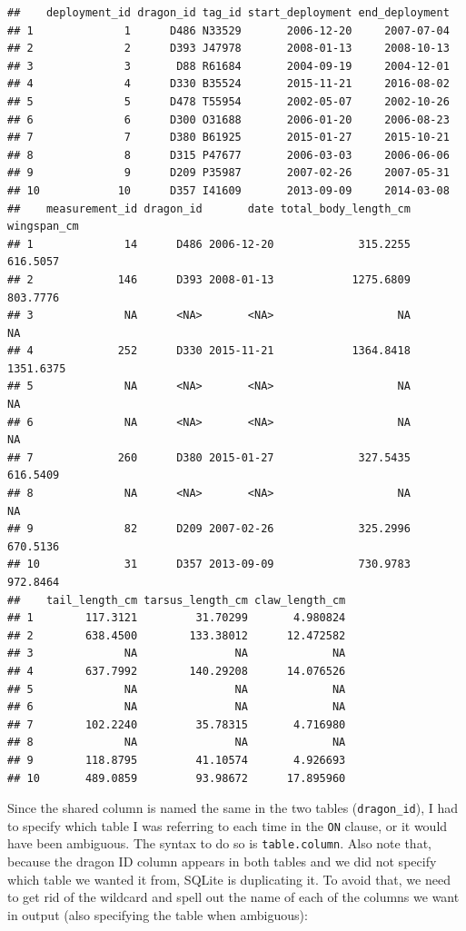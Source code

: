 \documentclass[
]{book}
\begin{document}
\begin{verbatim}
##    deployment_id dragon_id tag_id start_deployment end_deployment
## 1              1      D486 N33529       2006-12-20     2007-07-04
## 2              2      D393 J47978       2008-01-13     2008-10-13
## 3              3       D88 R61684       2004-09-19     2004-12-01
## 4              4      D330 B35524       2015-11-21     2016-08-02
## 5              5      D478 T55954       2002-05-07     2002-10-26
## 6              6      D300 O31688       2006-01-20     2006-08-23
## 7              7      D380 B61925       2015-01-27     2015-10-21
## 8              8      D315 P47677       2006-03-03     2006-06-06
## 9              9      D209 P35987       2007-02-26     2007-05-31
## 10            10      D357 I41609       2013-09-09     2014-03-08
##    measurement_id dragon_id       date total_body_length_cm wingspan_cm
## 1              14      D486 2006-12-20             315.2255    616.5057
## 2             146      D393 2008-01-13            1275.6809    803.7776
## 3              NA      <NA>       <NA>                   NA          NA
## 4             252      D330 2015-11-21            1364.8418   1351.6375
## 5              NA      <NA>       <NA>                   NA          NA
## 6              NA      <NA>       <NA>                   NA          NA
## 7             260      D380 2015-01-27             327.5435    616.5409
## 8              NA      <NA>       <NA>                   NA          NA
## 9              82      D209 2007-02-26             325.2996    670.5136
## 10             31      D357 2013-09-09             730.9783    972.8464
##    tail_length_cm tarsus_length_cm claw_length_cm
## 1        117.3121         31.70299       4.980824
## 2        638.4500        133.38012      12.472582
## 3              NA               NA             NA
## 4        637.7992        140.29208      14.076526
## 5              NA               NA             NA
## 6              NA               NA             NA
## 7        102.2240         35.78315       4.716980
## 8              NA               NA             NA
## 9        118.8795         41.10574       4.926693
## 10       489.0859         93.98672      17.895960
\end{verbatim}

Since the shared column is named the same in the two tables (\texttt{dragon\_id}), I had
to specify which table I was referring to each time in the \texttt{ON} clause, or it
would have been ambiguous. The syntax to do so is \texttt{table.column}. Also note that,
because the dragon ID column appears in both tables and we did not specify which
table we wanted it from, SQLite is duplicating it. To avoid that, we need to get
rid of the wildcard and spell out the name of each of the columns we want in
output (also specifying the table when ambiguous):
\end{document}
